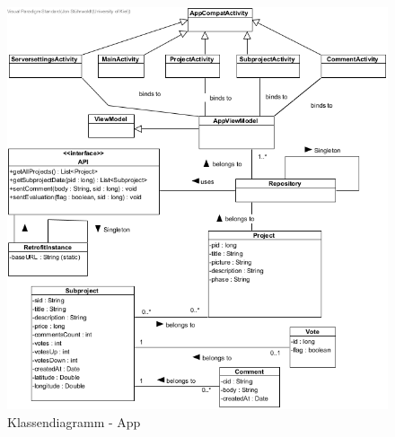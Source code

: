 \begin{figure}[H]
	\centering
	\includegraphics[width=\textwidth]{img/classapp.png}	
	\caption{Klassendiagramm - App}
	\label{fig:klassendiagramm-app}
\end{figure}

